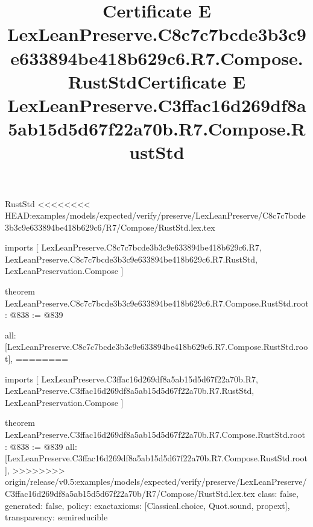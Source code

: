 \begin{lexlean}{RustStd}
<<<<<<<< HEAD:examples/models/expected/verify/preserve/LexLeanPreserve/C8c7c7bcde3b3c9e633894be418b629c6/R7/Compose/RustStd.lex.tex
\title{Certificate E LexLeanPreserve.C8c7c7bcde3b3c9e633894be418b629c6.R7.Compose.RustStd}
\begin{coremodule}
imports [
  LexLeanPreserve.C8c7c7bcde3b3c9e633894be418b629c6.R7,
  LexLeanPreserve.C8c7c7bcde3b3c9e633894be418b629c6.R7.RustStd,
  LexLeanPreservation.Compose
]

theorem LexLeanPreserve.C8c7c7bcde3b3c9e633894be418b629c6.R7.Compose.RustStd.root : @838 := @839 {
  all: [LexLeanPreserve.C8c7c7bcde3b3c9e633894be418b629c6.R7.Compose.RustStd.root],
========
\title{Certificate E LexLeanPreserve.C3ffac16d269df8a5ab15d5d67f22a70b.R7.Compose.RustStd}
\begin{coremodule}
imports [
  LexLeanPreserve.C3ffac16d269df8a5ab15d5d67f22a70b.R7,
  LexLeanPreserve.C3ffac16d269df8a5ab15d5d67f22a70b.R7.RustStd,
  LexLeanPreservation.Compose
]

theorem LexLeanPreserve.C3ffac16d269df8a5ab15d5d67f22a70b.R7.Compose.RustStd.root : @838 := @839 {
  all: [LexLeanPreserve.C3ffac16d269df8a5ab15d5d67f22a70b.R7.Compose.RustStd.root],
>>>>>>>> origin/release/v0.5:examples/models/expected/verify/preserve/LexLeanPreserve/C3ffac16d269df8a5ab15d5d67f22a70b/R7/Compose/RustStd.lex.tex
  class: false,
  generated: false,
  policy: exact{axioms: [Classical.choice, Quot.sound, propext]},
  transparency: semireducible
}


\end{coremodule}}
\end{coremodule}
\end{lexlean}
